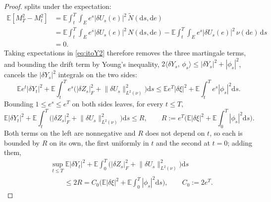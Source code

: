 \documentclass[preprint,12pt]{elsarticle}
\newcommand{\E}{\mathbb{E}}
\newcommand{\diff}{\mathrm{d}}
\newcommand{\Nt}{\widetilde{N}}
\newcommand{\inner}[2]{\langle #1,\,#2\rangle}
\newcommand{\Lnu}{L^2(\nu)}
\newcommand{\Lnorm}[1]{\lVert #1\rVert_{\Lnu}}
\numberwithin{equation}{section}
\theoremstyle{plain}
\theoremstyle{definition}
\theoremstyle{\PaperRemarkStyle}
\begin{document}
\begin{proof}
splits under the expectation:
\begin{align*}
\E[M^2_T-M^2_t]
&=\E\!\int_t^T\!\!\int_E e^{s}|\delta U_s(e)|^2\,\Nt(\diff s,\diff e)\\
&=\E\!\int_t^T\!\!\int_E e^{s}|\delta U_s(e)|^2\,N(\diff s,\diff e)
-\E\!\int_t^T\!\!\int_E e^{s}|\delta U_s(e)|^2\,\nu(\diff e)\,\diff s\\
&=0 .
\end{align*}
Taking
expectations in \eqref{eq:itoY2} therefore removes the three martingale terms, and
bounding the drift term by Young's inequality,
$2\inner{\delta Y_s}{\phi_s}\le|\delta Y_s|^2+|\phi_s|^2$, cancels the $|\delta Y_s|^2$
integrals on the two sides:
\[
\E e^{t}|\delta Y_t|^2
+\E\int_t^T e^{s}\big(|\delta Z_s|_F^2+\Lnorm{\delta U_s}^2\big)\diff s
\le
\E e^{T}|\delta\xi|^2
+\E\int_t^T e^{s}|\phi_s|^2\diff s .
\]
Bounding $1\le e^{s}\le e^{T}$ on both sides leaves, for every $t\le T$,
\[
\E|\delta Y_t|^2+\E\int_t^T\big(|\delta Z_s|_F^2+\Lnorm{\delta U_s}^2\big)\diff s\le R ,
\qquad
R:=e^{T}\Big(\E|\delta\xi|^2+\E\int_0^T|\phi_s|^2\diff s\Big).
\]
Both terms on the left are nonnegative and $R$ does not depend on $t$, so each is bounded
by $R$ on its own, the first uniformly in $t$ and the second at $t=0$; adding them,
\begin{equation}\label{eq:supE}
\begin{aligned}
&\sup_{t\le T}\E|\delta Y_t|^2
+\E\int_0^T\big(|\delta Z_s|_F^2+\Lnorm{\delta U_s}^2\big)\diff s\\
&\qquad\le 2R
=C_0\Big(\E|\delta\xi|^2+\E\int_0^T|\phi_s|^2\diff s\Big),
\qquad
C_0:=2e^{T} .
\end{aligned}
\end{equation}


\end{proof}
\end{document}
